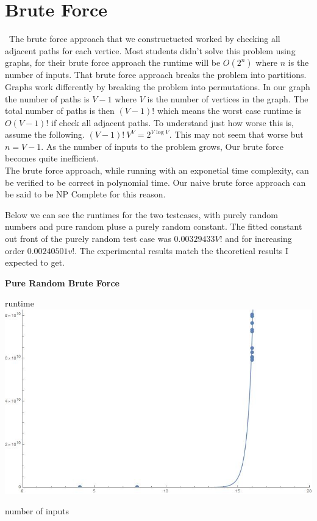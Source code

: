 \documentclass[12pt]{report}
\begin{document}
\section*{Brute Force}
\
The brute force approach that we constructucted worked by checking all adjacent paths
for each vertice. Most students didn't solve this problem using graphs, for their 
brute force approach the runtime will be $O(2^n)$ where $n$ is the number of inputs.
That brute force approach breaks the problem into partitions. Graphs work differently
by breaking the problem into permutations. In our graph the number
of paths is $V-1$ where $V$ is the number of vertices in the graph. The total number of
paths is then $(V-1)!$ which means the worst case runtime is $O(V-1)!$ if check all adjacent
paths. To understand
just how worse this is, assume the following. $(V-1)! ~ V^V = 2^{V \log{V}}$. This may
not seem that worse but $n = V - 1$. As the number of inputs to the problem grows,
Our brute force becomes quite inefficient.\\
The brute force approach, while running with an exponetial time complexity, can be verified
to be correct in polynomial time. Our naive brute force approach can be said to be NP Complete
for this reason.

\noindent Below we can see the runtimes for the two testcases, with purely random numbers and pure random
pluse a purely random constant. The fitted constant out front of the purely random test case
was $0.00329433V!$ and for increasing order $0.00240501 v!$. The experimental results match the
theoretical results I expected to get.
\\\newpage
\centerline{\textbf{Pure Random Brute Force}}
runtime \includegraphics[scale=.5]{purebrute.jpg}\\
\centerline{number of inputs}
\end{document}
